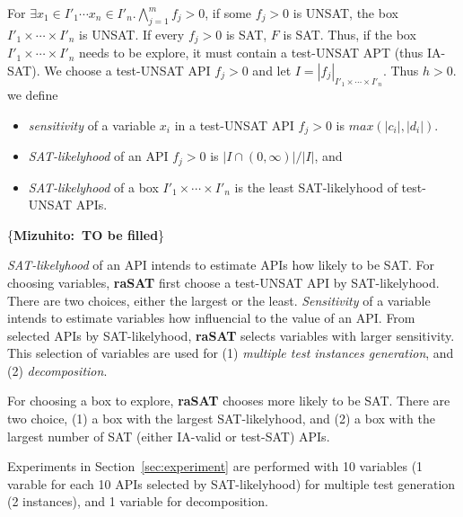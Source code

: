 \documentclass[runningheads,a4paper,oribibl]{llncs}
\newcommand{\suppress}[1]{} %
\newcommand{\mizuhito}[1]{\{{\bf Mizuhito:~\sf #1}\}} %
\begin{document}
For $\exists x_1 \in I'_1 \cdots x_n \in I'_n. \bigwedge \limits_{j=1}^m f_j > 0$, 
if some $f_j > 0$ is UNSAT, the box $I'_1 \times \cdots \times I'_n$ is UNSAT. 
If every $f_j > 0$ is SAT, $F$ is SAT. 
Thus, if the box $I'_1 \times \cdots \times I'_n$ needs to be explore, it must contain 
a test-UNSAT APT (thus IA-SAT). 
We choose a test-UNSAT API $f_j > 0$ and let $I = | f_j |_{I'_1 \times \cdots \times I'_n}$. 
Thus $h > 0$. we define 
\begin{itemize} 
\item {\em sensitivity} of a variable $x_i$ in a test-UNSAT API $f_j > 0$ is $max(|c_i|, |d_i|)$. 
\item {\em SAT-likelyhood} of an API $f_j > 0$ is $| I \cap (0,\infty) | / |I|$, and 
\item {\em SAT-likelyhood} of a box $I'_1 \times \cdots \times I'_n$ is 
the least SAT-likelyhood of test-UNSAT APIs. 
\end{itemize} 

\begin{example}
\mizuhito{TO be filled}
\end{example}


{\em SAT-likelyhood} of an API intends to estimate APIs how likely to be SAT. 
For choosing variables, {\bf raSAT} first choose a test-UNSAT API by SAT-likelyhood. 
There are two choices, either the largest or the least. 
{\em Sensitivity} of a variable intends to estimate variables how influencial to the value of an API. 
From selected APIs by SAT-likelyhood, {\bf raSAT} selects variables with larger sensitivity. 
This selection of variables are used for (1) {\em multiple test instances generation}, and 
(2) {\em decomposition}. 

For choosing a box to explore, {\bf raSAT} chooses more likely to be SAT. 
There are two choice, (1) a box with the largest SAT-likelyhood, and 
(2) a box with the largest number of SAT (either IA-valid or test-SAT) APIs. 

Experiments in Section~\ref{sec:experiment} are performed 
with 10 variables (1 varable for each 10 APIs selected by SAT-likelyhood) 
for multiple test generation (2 instances), and 
1 variable for decomposition. 

\suppress{
I. Selecting API for testing:
  (1) Difficulty first by SAT-likelihood.   
  (2) Easy first by SAT-likelihood
  (10) Random.,
II. Selecting Variable:
  (8) With sensitivity
  (9) Without sensitivity - Random: 
III. Selecting box:
  (3) SAT-directed using IA-Testing.
  (4) UNSAT-directed using IA-Testing.
  (5) SAT-directed using SAT-likelihood
  (6) UNSAT-directed using SAT-likelihood
  (7) Random
}
\end{document}
